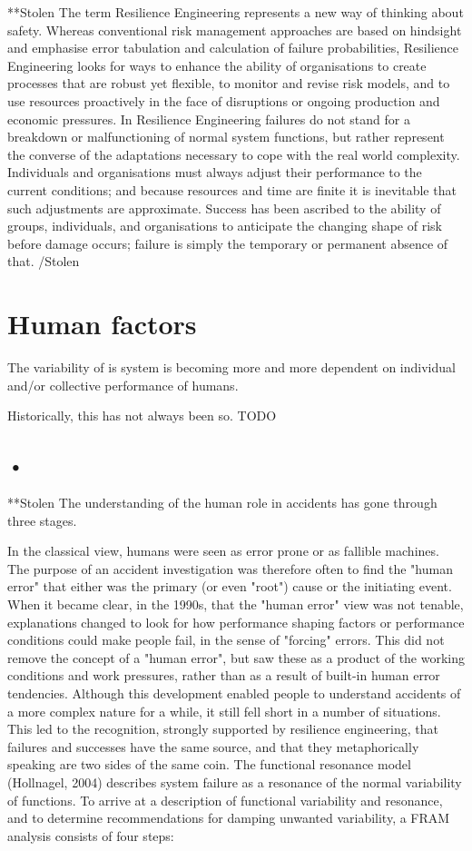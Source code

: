 **Stolen
The term Resilience Engineering represents a new way of thinking about safety. Whereas conventional risk management approaches are based on hindsight and emphasise error tabulation and calculation of failure probabilities, Resilience Engineering looks for ways to enhance the ability of organisations to create processes that are robust yet flexible, to monitor and revise risk models, and to use resources proactively in the face of disruptions or ongoing production and economic pressures. In Resilience Engineering failures do not stand for a breakdown or malfunctioning of normal system functions, but rather represent the converse of the adaptations necessary to cope with the real world complexity. Individuals and organisations must always adjust their performance to the current conditions; and because resources and time are finite it is inevitable that such adjustments are approximate. Success has been ascribed to the ability of groups, individuals, and organisations to anticipate the changing shape of risk before damage occurs; failure is simply the temporary or permanent absence of that.
/Stolen


\section{Human factors}
The variability of is system is becoming more and more dependent on individual and/or collective performance of humans.

Historically, this has not always been so.
TODO


\subsection{•}
**Stolen
The understanding of the human role in accidents has gone through three stages. 

In the classical view, humans were seen as error prone or as fallible machines. The purpose of an accident investigation was therefore often to find the "human error" that either was the primary (or even "root") cause or the initiating event.
When it became clear, in the 1990s, that the "human error" view was not tenable, explanations changed to look for how performance shaping factors or performance conditions could make people fail, in the sense of "forcing" errors. This did not remove the concept of a "human error", but saw these as a product of the working conditions and work pressures, rather than as a result of built-in human error tendencies.
Although this development enabled people to understand accidents of a more complex nature for a while, it still fell short in a number of situations. This led to the recognition, strongly supported by resilience engineering, that failures and successes have the same source, and that they metaphorically speaking are two sides of the same coin.
The functional resonance model (Hollnagel, 2004) describes system failure as a resonance of the normal variability of functions. To arrive at a description of functional variability and resonance, and to determine recommendations for damping unwanted variability, a FRAM analysis consists of four steps:

